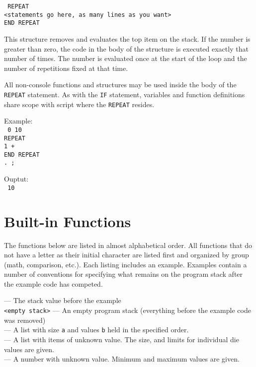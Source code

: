 \breakline

\noindent\texttt{%
REPEAT\\
<statements go here, as many lines as you want>\\
END REPEAT}

This structure removes and evaluates the top item on the stack. If the number
is greater than zero, the code in the body of the structure is executed exactly
that number of times. The number is evaluated once at the start of the loop
and the number of repetitions fixed at that time.

All non-console functions and structures may be used inside the body of the
\texttt{REPEAT} statement. As with the \texttt{IF} statement, variables and
function definitions share scope with script where the \texttt{REPEAT}
resides.

\noindent Example:\\
\texttt{%
0 10 \\
REPEAT \\
1 +\\
END REPEAT\\
. ;}

Ouptut:\\
\texttt{%
10
}

\section{Built-in Functions}
\label{builtInFunctions}
The functions below are listed in almost alphabetical order. All functions that
do not have a letter as their initial character are listed first and organized
by group (math, comparison, etc.). Each listing includes an example. Examples
contain a number of conventions for specifying what remains on the program stack
after the example code has competed.

\noindent\texttt{\ostack} --- The stack value before the example\\
\texttt{<empty stack>} --- An empty program stack (everything before the example
code was removed)\\
\texttt{} --- A list with size \texttt{a} and values
\texttt{b} held in the specified order.\\
\texttt{} --- A list with items of unknown value. The size,
and limits for individual die values are given.\\
\texttt{} --- A number with unknown value. Minimum and 
maximum values are given.

